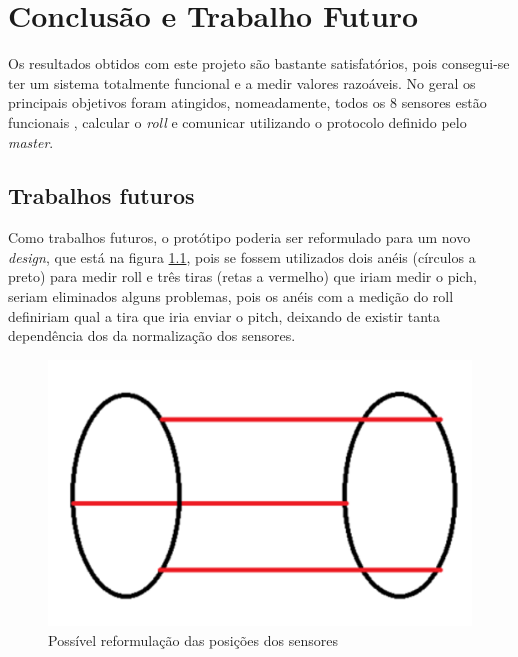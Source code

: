 \chapter{Conclusão e Trabalho Futuro}

Os resultados obtidos com este projeto são bastante satisfatórios, pois consegui-se ter um sistema totalmente funcional e a medir valores razoáveis.
No geral os principais objetivos foram atingidos, nomeadamente, todos os 8 sensores estão funcionais , calcular o \textit{roll} e comunicar utilizando o protocolo definido pelo \textit{master}.

\section{Trabalhos futuros}
Como trabalhos futuros, o protótipo poderia ser reformulado para um novo \textit{design}, que está na figura \ref{new}, pois se fossem utilizados dois anéis (círculos a preto) para medir roll e três tiras (retas a vermelho) que iriam medir o pich, seriam eliminados alguns problemas, pois os anéis com a medição do roll definiriam qual a tira que iria enviar o pitch, deixando de existir tanta dependência dos da normalização dos sensores.  

\begin{figure}[!htb]
\centering
\includegraphics[scale=0.7]{Figuras/new.PNG}
\caption{Possível reformulação das posições dos sensores}
\label{new}
\end{figure}
